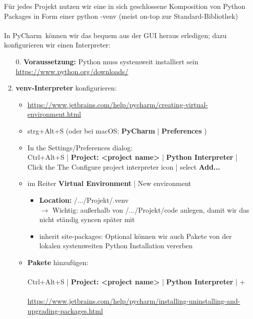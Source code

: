 	
	Für jedes Projekt nutzen wir eine in sich geschlossene Komposition von Python Packages in Form einer python -venv (meist on-top zur Standard-Bibliothek)  \\~\\
	In PyCharm~können wir das bequem aus der GUI heraus erledigen; dazu konfigurieren wir einen Interpreter:
	\begin{enumerate}
		\item[0.] \textbf{Voraussetzung:} Python muss systemweit installiert sein \url{https://www.python.org/downloads/}
		\item \textbf{venv-Interpreter} konfigurieren: 
		\begin{itemize}
			\item \url{https://www.jetbrains.com/help/pycharm/creating-virtual-environment.html}
			\item strg+Alt+S (oder bei macOS:  \textbf{PyCharm} | \textbf{Preferences} )
			\item In the Settings/Preferences dialog:\\ 
			Ctrl+Alt+S | \textbf{Project: <project name>} | \textbf{Python Interpreter} | 
			Click the The Configure project interpreter icon | select \textbf{Add...}
			\item im Reiter \textbf{Virtual Environment} | New environment	
			\begin{itemize}
				\item \textbf{Location: }/.../Projekt/.venv\\
				$\to$ {\color{red}Wichtig:}  außerhalb von /.../Projekt/code anlegen, damit wir das nicht ständig syncen später mit \git
				\item inherit site-packages: Optional können wir auch Pakete von der lokalen systemweiten Python Installation vererben		
			\end{itemize}
			\item  \textbf{Pakete} hinzufügen:\\~\\
			Ctrl+Alt+S | \textbf{Project: <project name>} | \textbf{Python Interpreter} | +\\~\\
			{\small \url{https://www.jetbrains.com/help/pycharm/installing-uninstalling-and-upgrading-packages.html}}		
		\end{itemize}

\end{enumerate}

